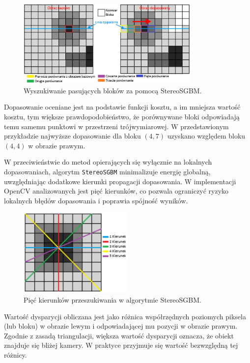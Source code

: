 \documentclass[magisterska]{pracadypl}
\begin{document}
\begin{figure}[H]
\centering
\includegraphics[width=0.8\textwidth]{images/dopracy1.png}
\captionsetup{font=footnotesize}
\caption[Wyszukiwanie pasujących bloków za pomocą StereoSGBM. Opracowanie własne.]{Wyszukiwanie pasujących bloków za pomocą StereoSGBM.}
\end{figure}

Dopasowanie oceniane jest na podstawie funkcji kosztu, a im mniejsza wartość kosztu, tym większe prawdopodobieństwo, że porównywane bloki odpowiadają temu samemu punktowi w przestrzeni trójwymiarowej. W przedstawionym przykładzie najwyższe dopasowanie dla bloku $(4,7)$ uzyskano względem bloku $(4,4)$ w obrazie prawym.

W przeciwieństwie do metod opierających się wyłącznie na lokalnych dopasowaniach, algorytm \texttt{StereoSGBM} minimalizuje energię globalną, uwzględniając dodatkowe kierunki propagacji dopasowania. W implementacji OpenCV analizowanych jest pięć kierunków, co pozwala ograniczyć ryzyko lokalnych błędów dopasowania i poprawia spójność wyników.

\begin{figure}[H]
\centering
\includegraphics[width=0.5\textwidth]{images/dopracy2.png}
\captionsetup{font=footnotesize}
\caption[Pięć kierunków przeszukiwania w algorytmie StereoSGBM. Opracowanie własne.]{Pięć kierunków przeszukiwania w algorytmie StereoSGBM.}
\end{figure}

Wartość dysparycji obliczana jest jako różnica współrzędnych poziomych piksela (lub bloku) w obrazie lewym i odpowiadającej mu pozycji w obrazie prawym. Zgodnie z zasadą triangulacji, większa wartość dysparycji oznacza, że obiekt znajduje się bliżej kamery. W praktyce przyjmuje się wartość bezwzględną tej różnicy.
\end{document}

